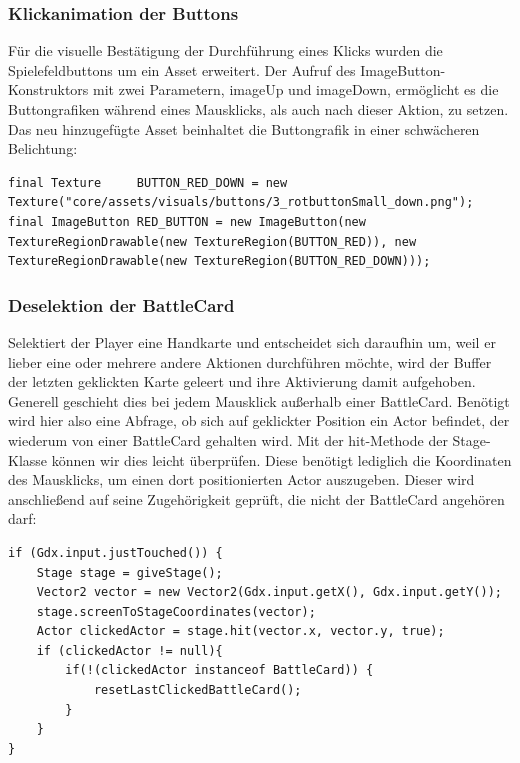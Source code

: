 \subsubsection{Klickanimation der Buttons}
Für die visuelle Bestätigung der Durchführung eines Klicks wurden die Spielefeldbuttons um ein Asset erweitert. Der Aufruf des ImageButton-Konstruktors mit zwei Parametern, imageUp und imageDown, ermöglicht es die Buttongrafiken während eines Mausklicks, als auch nach dieser Aktion, zu setzen. Das neu hinzugefügte Asset beinhaltet die Buttongrafik in einer schwächeren Belichtung:

\begin{lstlisting}
final Texture     BUTTON_RED_DOWN = new Texture("core/assets/visuals/buttons/3_rotbuttonSmall_down.png");
final ImageButton RED_BUTTON = new ImageButton(new TextureRegionDrawable(new TextureRegion(BUTTON_RED)), new TextureRegionDrawable(new TextureRegion(BUTTON_RED_DOWN)));
\end{lstlisting}

\subsubsection{Deselektion der BattleCard}
Selektiert der Player eine Handkarte und entscheidet sich daraufhin um, weil er lieber eine oder mehrere andere Aktionen durchführen möchte, wird der Buffer der letzten geklickten Karte geleert und ihre Aktivierung damit aufgehoben. Generell geschieht dies bei jedem Mausklick außerhalb einer BattleCard.
Benötigt wird hier also eine Abfrage, ob sich auf geklickter Position ein Actor befindet, der wiederum von einer BattleCard gehalten wird.
Mit der hit-Methode der Stage-Klasse können wir dies leicht überprüfen. Diese benötigt lediglich die Koordinaten des Mausklicks, um einen dort positionierten Actor auszugeben. Dieser wird anschließend auf seine Zugehörigkeit geprüft, die nicht der BattleCard angehören darf:

\begin{lstlisting}
if (Gdx.input.justTouched()) {
	Stage stage = giveStage();
	Vector2 vector = new Vector2(Gdx.input.getX(), Gdx.input.getY());
	stage.screenToStageCoordinates(vector);
	Actor clickedActor = stage.hit(vector.x, vector.y, true);
	if (clickedActor != null){
		if(!(clickedActor instanceof BattleCard)) {
			resetLastClickedBattleCard();
		}
	}
}
\end{lstlisting}

